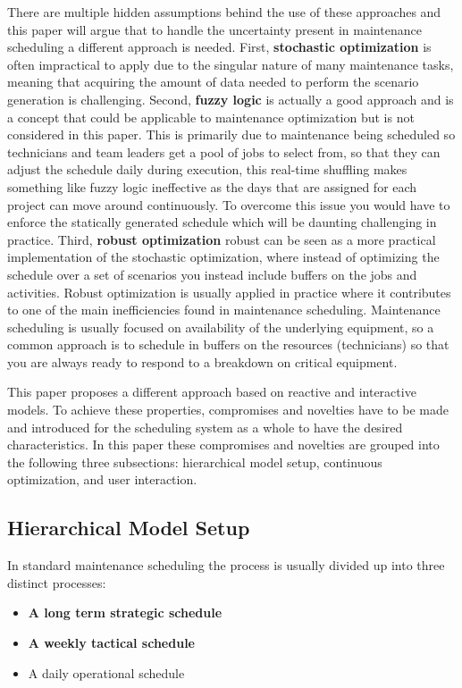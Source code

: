 \documentclass[runningheads]{llncs}
\begin{document}
There are multiple hidden assumptions behind the use of these approaches and this paper will argue that to handle the uncertainty present in maintenance scheduling a different approach is needed. First, \textbf{stochastic optimization} is often impractical to apply due to the singular nature of many maintenance tasks, meaning that acquiring the amount of data needed to perform the scenario generation is challenging. Second, \textbf{fuzzy logic} is actually a good approach and is a concept that could be applicable to maintenance optimization but is not considered in this paper. This is primarily due to maintenance being scheduled so technicians and team leaders get a pool of jobs to select from, so that they can adjust the schedule daily during execution, this real-time shuffling makes something like fuzzy logic ineffective as the days that are assigned for each project can move around continuously. To overcome this issue you would have to enforce the statically generated schedule which will be daunting challenging in practice. Third, \textbf{robust optimization} robust can be seen as a more practical implementation of the stochastic optimization, where instead of optimizing the schedule over a set of scenarios you instead include buffers on the jobs and activities. Robust optimization is usually applied in practice where it contributes to one of the main inefficiencies found in maintenance scheduling. Maintenance scheduling is usually focused on availability of the underlying equipment, so a common approach is to schedule in buffers on the resources (technicians) so that you are always ready to respond to a breakdown on critical equipment. 

This paper proposes a different approach based on reactive and interactive models. To achieve these properties, compromises and novelties have to be made and introduced for the scheduling system as a whole to have the desired characteristics. In this paper these compromises and novelties are grouped into the following three subsections: hierarchical model setup, continuous optimization, and user interaction.


\subsection{Hierarchical Model Setup}
In standard maintenance scheduling the process is usually divided up into three distinct processes:
\begin{itemize}
    \item \textbf{A long term strategic schedule}
    \item \textbf{A weekly tactical schedule}
    \item A daily operational schedule
\end{itemize}
\end{document}
